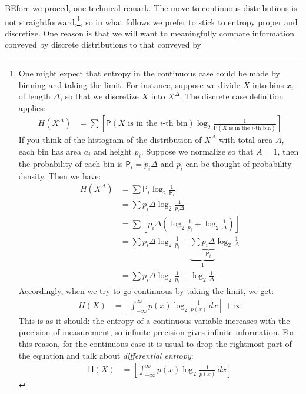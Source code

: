 \documentclass[
  10pt,
  dvipsnames,enabledeprecatedfontcommands]{scrartcl}
\begin{document}
BEfore we proced, one technical remark. The move to continuous
distributions is not straightforward,\footnote{One might expect that
  entropy in the continuous case could be made by binning and taking the
  limit. For instance, suppose we divide \(X\) into bins \(x_i\) of
  length \(\Delta\), so that we discretize \(X\) into \(X^\Delta\). The
  discrete case definition applies: \begin{align*}
  H(X^\Delta) & = \sum \left[\mathsf{P}(X \mbox{ is in the $i$-th bin}) \log_2 \frac{1}{\mathsf{P}(X \mbox{ is in the $i$-th bin})}\right]
  \end{align*} \noindent If you think of the histogram of the
  distribution of \(X^\Delta\) with total area \(A\), each bin has area
  \(a_i\) and height \(p_i\). Suppose we normalize so that \(A =1\),
  then the probability of each bin is \(\mathsf{P}_i = p_i \Delta\) and
  \(p_i\) can be thought of probability density. Then we have:
  \begin{align*}
  H(X^\Delta) & = \sum \mathsf{P}_i \log_2 \frac{1}{\mathsf{P}_i}\\
  & = \sum p_i \Delta \log_2 \frac{1}{p_i \Delta}\\
  & = \sum \left[ p_i \Delta \left(\log_2 \frac{1}{p_i} + \log_2\frac{1}{\Delta}\right)\right]\\
  & = \sum p_i \Delta \log_2 \frac{1}{p_i} +    \underbrace{\sum \underbrace{p_i \Delta}_{\mathsf{P}_i}}_1 \log_2\frac{1}{\Delta} \\
  & = \sum p_i \Delta \log_2 \frac{1}{p_i} +  \log_2\frac{1}{\Delta}
  \end{align*} \noindent Accordingly, when we try to go continuous by
  taking the limit, we get: \begin{align*}
  H(X) & = \left[\int_{-\infty}^\infty p(x) \log_2 \frac{1}{p(x)}\, dx  \right] + \infty
  \end{align*} \noindent This is as it should: the entropy of a
  continuous variable increases with the precision of measurement, so
  infinite precision gives infinite information. For this reason, for
  the continuous case it is usual to drop the rightmost part of the
  equation and talk about \emph{differential entropy}: \begin{align*}
  \mathsf{H}(X) & = \left[\int_{-\infty}^\infty p(x) \log_2 \frac{1}{p(x)}\, dx  \right] 
  \end{align*}}, so in what follows we prefer to stick to entropy proper
and discretize. One reason is that we will want to meaningfully compare
information conveyed by discrete distributions to that conveyed by
\end{document}
